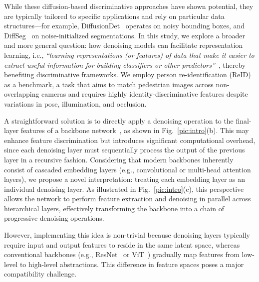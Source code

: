 \documentclass[conference]{IEEEtran}
\begin{document}
While these diffusion-based discriminative approaches have shown potential, they are typically tailored to specific applications and rely on particular data structures—for example, DiffusionDet~\cite{chen2023diffusiondet} operates on noisy bounding boxes, and DiffSeg~\cite{tian2023diffuse} on noise-initialized segmentations.
In this study, we explore a broader and more general question: how denoising models can facilitate representation learning, i.e., \textit{“learning representations (or features) of data that make it easier to extract useful information for building classifiers or other predictors”}~\cite{6472238}, thereby benefiting discriminative frameworks.
We employ person re-identification (ReID)~\cite{ye2021deep, bedagkar2014survey} as a benchmark, a task that aims to match pedestrian images across non-overlapping cameras and requires highly identity-discriminative features despite variations in pose, illumination, and occlusion.

A straightforward solution is to directly apply a denoising operation to the final-layer features of a backbone network~\cite{krizhevsky2012imagenet,dosovitskiy2020image}, as shown in Fig.~\ref{pic:intro}(b).
This may enhance feature discrimination but introduces significant computational overhead, since each denoising layer must sequentially process the output of the previous layer in a recursive fashion.
Considering that modern backbones inherently consist of cascaded embedding layers (e.g., convolutional or multi-head attention layers), we propose a novel interpretation: treating each embedding layer as an individual denoising layer.
As illustrated in Fig.~\ref{pic:intro}(c), this perspective allows the network to perform feature extraction and denoising in parallel across hierarchical layers, effectively transforming the backbone into a chain of progressive denoising operations.

However, implementing this idea is non-trivial because denoising layers typically require input and output features to reside in the same latent space, whereas conventional backbones (e.g., ResNet~\cite{krizhevsky2012imagenet} or ViT~\cite{dosovitskiy2020image}) gradually map features from low-level to high-level abstractions. This difference in feature spaces poses a major compatibility challenge.
\end{document}
